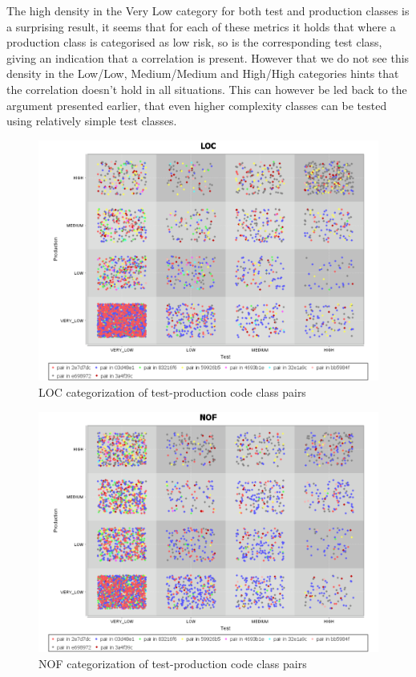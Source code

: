 The high density in the Very Low category for both test and production classes is a surprising result, it seems that for each of these metrics it holds that where a production class is categorised as low risk, so is the corresponding test class, giving an indication that a correlation is present. However that we do not see this density in the Low/Low, Medium/Medium and High/High categories hints that the correlation doesn't hold in all situations. This can however be led back to the argument presented earlier, that even higher complexity classes can be tested using relatively simple test classes.
\begin{figure}
    \centering
    \includegraphics[width=\linewidth]{resources/LOC.pdf}
    \caption{LOC categorization of test-production code class pairs}
    \label{figure:loc}
\end{figure}
\begin{figure}
    \centering
    \includegraphics[width=\linewidth]{resources/NOF.pdf}
    \caption{NOF categorization of test-production code class pairs}
    \label{figure:nof}
\end{figure}

